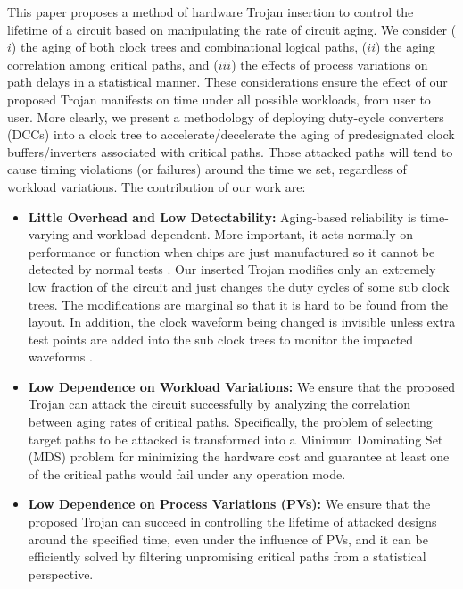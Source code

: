 This paper proposes a method of hardware Trojan insertion to control the lifetime of a circuit based on manipulating the rate of circuit aging. We consider ($i$) the aging of both clock trees and combinational logical paths, ($ii$) the aging correlation among critical paths, and ($iii$) the effects of process variations on path delays in a statistical manner.  These considerations ensure the effect of our proposed Trojan manifests on time under all possible workloads, from user to user. More clearly, we present a methodology of deploying duty-cycle converters (DCCs) into a clock tree to accelerate/decelerate the aging of predesignated clock buffers/inverters associated with critical paths. Those attacked paths will tend to cause timing violations (or failures) around the time we set, regardless of workload variations. The contribution of our work are:
\begin{itemize}[leftmargin=*]%
	\item \textbf{Little Overhead and Low Detectability:} Aging-based reliability is time-varying and workload-dependent. More important, it acts normally on performance or function when chips are just manufactured so it cannot be detected by normal tests \cite{sreedhar2012reliability}. Our inserted Trojan modifies only an extremely low fraction of the circuit and just changes the duty cycles of some sub clock trees. The modifications are marginal so that it is hard to be found from the layout. In addition, the clock waveform being changed is invisible unless extra test points are added into the sub clock trees to monitor the impacted waveforms \cite{sreedhar2012reliability}.
	\item \textbf{Low Dependence on Workload Variations:} We ensure that the proposed Trojan can attack the circuit successfully by analyzing the correlation between aging rates of critical paths. Specifically, the problem of selecting target paths to be attacked is transformed into a Minimum Dominating Set (MDS) problem for minimizing the hardware cost and guarantee at least one of the critical paths would fail under any operation mode.
	\item \textbf{Low Dependence on Process Variations (PVs):} We ensure that the proposed Trojan can succeed in controlling the lifetime of attacked designs around the specified time, even under the influence of PVs, and it can be efficiently solved by filtering unpromising critical paths from a statistical perspective. 
\end{itemize}

